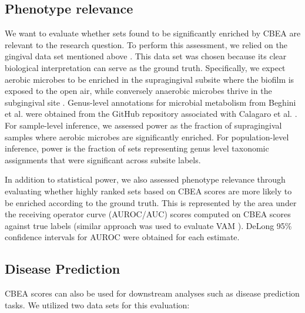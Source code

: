 \subsection{Phenotype relevance}
We want to evaluate whether sets found to be significantly enriched by CBEA are relevant to the research question. To perform this assessment, we relied on the gingival data set mentioned above \cite{consortium2012, proctor2019}. This data set was chosen because its clear biological interpretation can serve as the ground truth. Specifically, we expect aerobic microbes to be enriched in the supragingival subsite where the biofilm is exposed to the open air, while conversely anaerobic microbes thrive in the subgingival site \cite{thurnheer2016}. Genus-level annotations for microbial metabolism from Beghini et al. \cite{beghini2019} were obtained from the GitHub repository associated with Calagaro et al. \cite{matteocalgaro2020}. For sample-level inference, we assessed power as the fraction of supragingival samples where aerobic microbes are significantly enriched. For population-level inference, power is the fraction of sets representing genus level taxonomic assignments that were significant across subsite labels.  

In addition to statistical power, we also assessed phenotype relevance through evaluating whether highly ranked sets based on CBEA scores are more likely to be enriched according to the ground truth. This is represented by the area under the receiving operator curve (AUROC/AUC) scores computed on CBEA scores against true labels (similar approach was used to evaluate VAM \cite{frost2020}). DeLong 95\% confidence intervals for AUROC \cite{delong1988} were obtained for each estimate. 

\subsection{Disease Prediction}
CBEA scores can also be used for downstream analyses such as disease prediction tasks. We utilized two data sets for this evaluation: 

